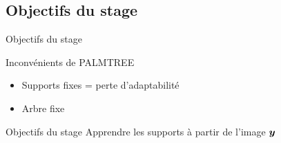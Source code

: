 \subsection{Objectifs du stage}
\begin{frame}{Objectifs du stage}
\begin{alertblock}{Inconvénients de PALMTREE}
\begin{itemize}
\item Supports fixes = perte d'adaptabilité
\item Arbre fixe
\end{itemize}
\end{alertblock}
\begin{figure}\centering
\end{figure}
\begin{exampleblock}{Objectifs du stage}
Apprendre les supports à partir de l'image $\bm{y}$
\end{exampleblock}
\end{frame}




